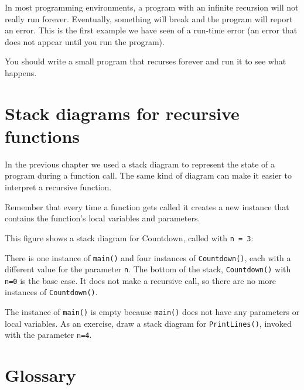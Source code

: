 
In most programming environments, a program with an infinite
recursion will not really run forever.  Eventually, something
will break and the program will report an error.  This is the
first example we have seen of a run-time error (an error that
does not appear until you run the program).

You should write a small program that recurses forever and run
it to see what happens.

\section {Stack diagrams for recursive functions}

In the previous chapter we used a stack diagram to represent the
state of a program during a function call.  The same kind
of diagram can make it easier to interpret a recursive function.

Remember that every time a function gets called it creates
a new instance that contains
the function's local variables and parameters.

This figure shows a stack diagram for Countdown, called
with {\tt n = 3}:

\vspace{0.1in}
\centerline{}
\vspace{0.1in}
%
There is one instance of {\tt main()} and four instances of
{\tt Countdown()}, each with a different value for the parameter
{\tt n}.  The bottom of the stack, {\tt Countdown()} with {\tt n=0}
is the base case.  It does not make a recursive call, so there
are no more instances of {\tt Countdown()}.

The instance of {\tt main()} is empty because {\tt main()} does not
have any parameters or local variables.  As an exercise, draw a
stack diagram for {\tt PrintLines()}, invoked with the parameter {\tt n=4}.


\section{Glossary}

